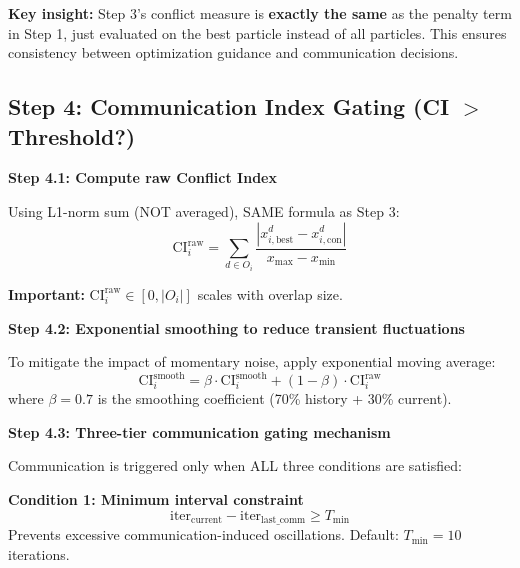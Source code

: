 \documentclass[11pt,a4paper]{article}
\begin{document}
\textbf{Key insight:} Step 3's conflict measure is \textbf{exactly the same} as the penalty term in Step 1, just evaluated on the best particle instead of all particles. This ensures consistency between optimization guidance and communication decisions.

\subsection{Step 4: Communication Index Gating (CI $>$ Threshold?)}

\textbf{Step 4.1: Compute raw Conflict Index}

Using L1-norm sum (NOT averaged), SAME formula as Step 3:
\begin{equation}
\text{CI}_i^{\text{raw}} = \sum_{d \in O_i} \frac{|x_{i,\text{best}}^d - x_{i,\text{con}}^d|}{x_{\max} - x_{\min}}
\end{equation}

\textbf{Important:} $\text{CI}_i^{\text{raw}} \in [0, |O_i|]$ scales with overlap size.

\textbf{Step 4.2: Exponential smoothing to reduce transient fluctuations}

To mitigate the impact of momentary noise, apply exponential moving average:
\begin{equation}
\text{CI}_i^{\text{smooth}} = \beta \cdot \text{CI}_i^{\text{smooth}} + (1 - \beta) \cdot \text{CI}_i^{\text{raw}}
\end{equation}
where $\beta = 0.7$ is the smoothing coefficient (70\% history + 30\% current).

\textbf{Step 4.3: Three-tier communication gating mechanism}

Communication is triggered only when ALL three conditions are satisfied:

\textbf{Condition 1: Minimum interval constraint}
\begin{equation}
\text{iter}_{\text{current}} - \text{iter}_{\text{last\_comm}} \geq T_{\min}
\end{equation}
Prevents excessive communication-induced oscillations. Default: $T_{\min} = 10$ iterations.
\end{document}
